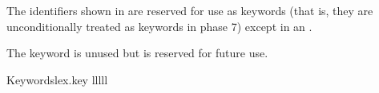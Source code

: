 \pnum
{}%
The identifiers shown in  are reserved for use
as keywords (that is, they are unconditionally treated as keywords in
phase 7) except in an .
\begin{note}
The  keyword is unused but
is reserved for future use.
\end{note}

\begin{multicolfloattable}{Keywords}{lex.key}
{lllll}
 \\
 \\
 \\
 \\
 \\
 \\
 \\
 \\
 \\
 \\
 \\
 \\
 \\
 \\
 \\
 \\
 \\
\columnbreak
{} \\
 \\
 \\
 \\
 \\
 \\
 \\
 \\
 \\
 \\
 \\
 \\
 \\
 \\
 \\
 \\
 \\

\end{multicolfloattable}
